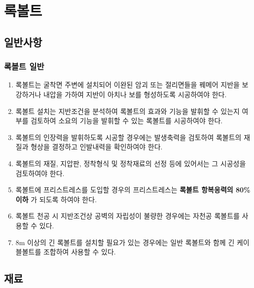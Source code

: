 \documentclass[12pt,a4paper]{article}
\begin{document}
%
%
%
\newpage
\section{록볼트}

\subsection{일반사항}

\subsubsection{록볼트 일반}
\begin{enumerate}
\item  록볼트는 굴착면 주변에 설치되어 이완된 암괴 또는 절리면들을 꿰메어 지반을 보강하거나 내압을 가하여 지반이 아치나 보를 
       형성하도록 시공하여야 한다.  
\item  록볼트 설치는 지반조건을 분석하여 록볼트의 효과와 기능을 발휘할 수 있는지 여부를 검토하여 소요의 기능을 발휘할 수 있는 
       록볼트를 시공하여야 한다.  
\item  록볼트의 인장력을 발휘하도록 시공할 경우에는 발생축력을 검토하여 록볼트의 재질과 형상을 결정하고 인발내력을 확인하여야 한다.  
\item  록볼트의 재질, 지압판, 정착형식 및 정착재료의 선정 등에 있어서는 그 시공성을 검토하여야 한다.  
\item  록볼트에 프리스트레스를 도입할 경우의 프리스트레스는 \textbf {록볼트 항복응력의 80\% 이하} 
       가 되도록 하여야 한다.  
\item  록볼트 천공 시 지반조건상 공벽의 자립성이 불량한 경우에는 자천공 록볼트를 사용할 수 있다.  
\item  8m 이상의 긴 록볼트를 설치할 필요가 있는 경우에는 일반 록볼트와 함께 긴 케이블볼트를 조합하여 사용할 수 있다.  
\end{enumerate}

\subsection{재료}
\end{document}
